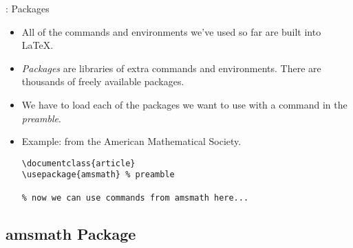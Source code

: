 \begin{frame}[fragile]{\insertsubsection{}: Packages}

    \begin{itemize}
        \item All of the commands and environments we've used so far are built into \LaTeX.
        \item \emph{Packages} are libraries of extra commands and environments. There
              are thousands of freely available packages.
        \item We have to load each of the packages we want to use with a
               command in the \emph{preamble}.
        \item Example:  from the American Mathematical Society.
              \begin{lstlisting}
\documentclass{article}
\usepackage{amsmath} % preamble

% now we can use commands from amsmath here...

            \end{lstlisting}
    \end{itemize}
\end{frame}

\subsection{amsmath Package}

